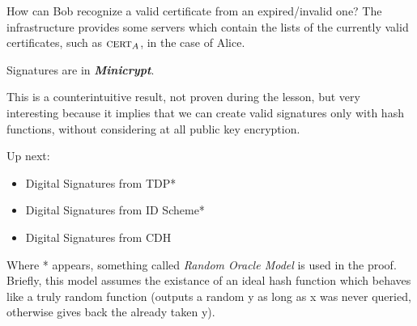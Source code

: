 How can Bob recognize a valid certificate from an expired/invalid one? The infrastructure provides some servers which contain the lists of the currently valid certificates, such as $\textsc{cert}_A$, in the case of Alice.

\begin{theorem}
    Signatures are in \textit{\textbf{Minicrypt}}.
\end{theorem}

This is a counterintuitive result, not proven during the lesson, but very interesting because it implies that we can create valid signatures only with hash functions, without considering at all public key encryption.


Up next:
\begin{itemize}
    \item Digital Signatures from TDP*
    \item Digital Signatures from ID Scheme*
    \item Digital Signatures from CDH
\end{itemize}

Where * appears, something called \textit{Random Oracle Model} is used in the proof. Briefly, this model assumes the existance of an ideal hash function which behaves like a truly random function (outputs a random y as long as x was never queried, otherwise gives back the already taken y).
